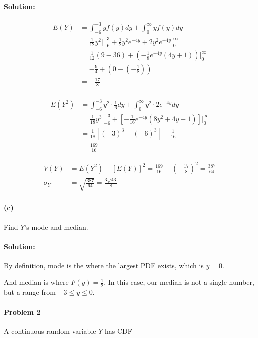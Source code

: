 \documentclass[a4paper, 11pt, twoside]{article}
\begin{document}
\paragraph{Solution:}

\[
\begin{split}
	E(Y)&=\int^{-3}_{-6}yf(y)dy + \int^{\infty}_0yf(y)dy\\
	&=\frac{1}{12}y^2\bigg\rvert^{-3}_{-6} + \frac{1}{2}y^2e^{-4y}+2y^2e^{-4y}\bigg\rvert^\infty_0\\
	&=\frac{1}{12}(9-36)+\left(-\frac{1}{8}e^{-4y}(4y+1)\right)\bigg\rvert^\infty_0\\
	&=-\frac{9}{4}+(0-(-\frac{1}{8}))\\
	&=-\frac{17}{8}\\
	\end{split}
\]

\[
\begin{split}
	E(Y^2)&=\int^{-3}_{-6}y^2\cdot \frac{1}{6}dy + \int^{\infty}_0y^2\cdot 2e^{-4y}dy\\
	&= \frac{1}{18}y^3\bigg\rvert^{-3}_{-6}+\left[-\frac{1}{16}e^{-4y}(8y^2+4y+1)\right]\bigg\rvert^\infty_0\\
	&=\frac{1}{18}[(-3)^3-(-6)^3]+\frac{1}{16}\\
	&=\frac{169}{16}
\end{split}
\]

\[
\begin{split}
	V(Y)&=E(Y^2)-[E(Y)]^2=\frac{169}{16}-\left(-\frac{17}{8}\right)^2=\frac{387}{64}\\
	\sigma_Y&=\sqrt{\frac{387}{64}}=\frac{3\sqrt{43}}{8}
\end{split}
\]

\paragraph{(c)} Find $Y$'s mode and median.

\paragraph{Solution:}

By definition, mode is the where the largest PDF exists, which is $y=0$.

And median is where $F(y)=\frac{1}{2}$. In this case, our median is not a single number, but a range from $-3\leq y\leq 0$.

\paragraph{Problem 2} A continuous random variable $Y$ has CDF
\end{document}
